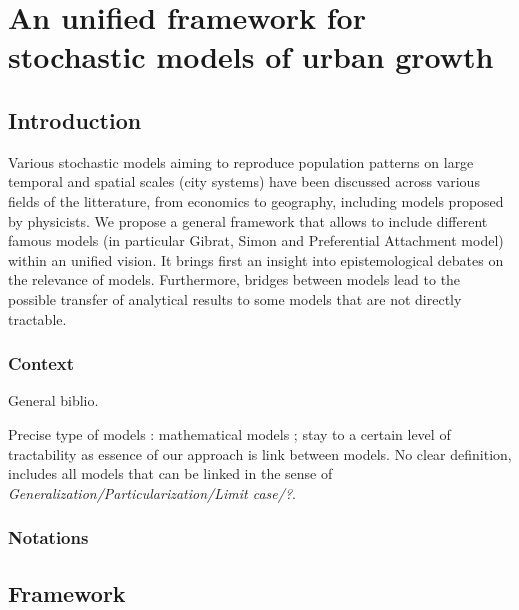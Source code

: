 


\newpage

\section{An unified framework for stochastic models of urban growth}




\subsection{Introduction}

Various stochastic models aiming to reproduce population patterns on large temporal and spatial scales (city systems) have been discussed across various fields of the litterature, from economics to geography, including models proposed by physicists. We propose a general framework that allows to include different famous models (in particular Gibrat, Simon and Preferential Attachment model) within an unified vision. It brings first an insight into epistemological debates on the relevance of models. Furthermore, bridges between models lead to the possible transfer of analytical results to some models that are not directly tractable.


\subsubsection{Context}

General biblio.

Precise type of models : mathematical models ; stay to a certain level of tractability as essence of our approach is link between models. No clear definition, includes all models that can be linked in the sense of \emph{Generalization/Particularization/Limit case/?}.


\subsubsection{Notations}



\subsection{Framework}


